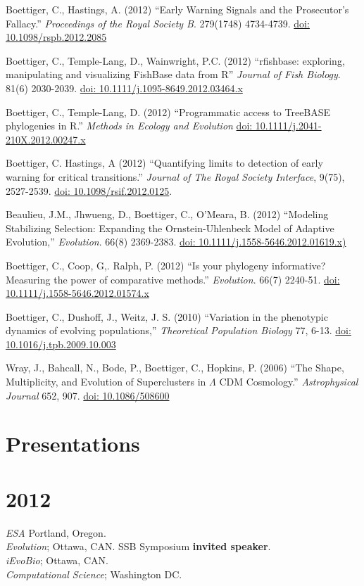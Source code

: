 \documentclass[margin]{res}
\begin{document}
\begin{resume}
Boettiger, C., Hastings, A. (2012) ``Early Warning Signals and the Prosecutor's Fallacy.'' {\it Proceedings of the Royal Society B}. 279(1748) 4734-4739.   \href{http://dx.doi.org/10.1098/rspb.2012.2085}{doi: 10.1098/rspb.2012.2085}

Boettiger, C., Temple-Lang, D., Wainwright, P.C. (2012) ``rfishbase: exploring, manipulating and visualizing FishBase data from R'' {\it Journal of Fish Biology}. 81(6) 2030-2039. \href{http://dx.doi.org/10.1111/j.1095-8649.2012.03464.x}{doi: 10.1111/j.1095-8649.2012.03464.x}

Boettiger, C., Temple-Lang, D. (2012)  ``Programmatic access to TreeBASE phylogenies in R.'' {\it Methods in Ecology and Evolution}  \href{http://dx.doi.org/10.1111/j.2041-210X.2012.00247.x}{doi: 10.1111/j.2041-210X.2012.00247.x}


Boettiger, C. Hastings, A (2012) ``Quantifying limits to detection of early warning for critical transitions.'' {\it Journal of The Royal Society Interface},  9(75), 2527-2539. \href{http://dx.doi.org/10.1098/rsif.2012.0125}{doi: 10.1098/rsif.2012.0125}.

Beaulieu, J.M., Jhwueng, D., Boettiger, C., O'Meara, B. (2012) ``Modeling Stabilizing Selection: Expanding the Ornstein-Uhlenbeck Model of Adaptive Evolution,'' {\it Evolution}. 66(8) 2369-2383. \href{http://dx.doi.org/10.1111/j.1558-5646.2012.01619.x}{doi: 10.1111/j.1558-5646.2012.01619.x)}

Boettiger, C., Coop, G,. Ralph, P. (2012) ``Is your phylogeny informative? Measuring the power of comparative methods.'' {\it Evolution}. 66(7) 2240-51. \href{http://dx.doi.org/10.1111/j.1558-5646.2012.01574.x}{doi: 10.1111/j.1558-5646.2012.01574.x}

Boettiger, C., Dushoff, J., Weitz, J. S. (2010) ``Variation in the phenotypic dynamics of evolving populations,'' {\it Theoretical Population Biology} 77, 6-13. \href{http://dx.doi.org/10.1016/j.tpb.2009.10.003}{doi: 10.1016/j.tpb.2009.10.003}

Wray, J., Bahcall, N., Bode, P., Boettiger, C., Hopkins, P.  (2006)  ``The Shape, Multiplicity, and Evolution of Superclusters in $\Lambda$ CDM Cosmology.''  {\it Astrophysical Journal} 652, 907. \href{http://dx.doi.org/10.1086/508600}{doi: 10.1086/508600}


\section{Presentations} 

\section{\textnormal{2012}}
  \emph{ESA} Portland, Oregon. \\ 
  \emph{Evolution}; Ottawa, CAN. SSB Symposium \textbf{invited speaker}.\\
  \emph{iEvoBio}; Ottawa, CAN. \\
  \emph{Computational Science}; Washington DC. 

\end{resume}
\end{document}
